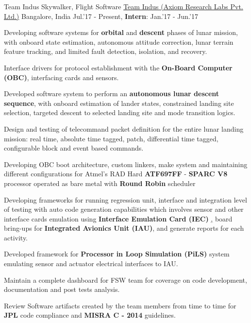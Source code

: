 \begin{cventries}
	\cventry
	{Team Indus Skywalker, Flight Software}
	{\href{http://www.teamindus.in/}{Team Indus (Axiom Research Labs Pvt. Ltd.)}}
	{Bangalore, India}
	{Jul.'17 - Present, \textbf{Intern}: Jan.'17 - Jun.'17}
	{
		\begin{cvitems}
			\item{Developing software systems for \textbf{orbital} and \textbf{descent} phases of lunar mission, with onboard state estimation, autonomous attitude correction, lunar terrain feature tracking, and limited fault detection, isolation, and recovery.}
			\item{Interface drivers for protocol establishment with the \textbf{On-Board Computer (OBC)}\href{http://ww1.microchip.com/downloads/en/DeviceDoc/ATF697FF.pdf}, interfacing cards and sensors.}
			\item{Developed software system to perform an \textbf{autonomous lunar descent sequence}, with onboard estimation of lander states, constrained landing site selection, targeted descent to selected landing site and mode transition logics.}
			\item{Design and testing of telecommand packet definition for the entire lunar landing mission: real time, absolute time tagged, patch, differential time tagged, configurable block and event based commands.}
			\item{Developing OBC boot architecture, custom linkers, make system and maintaining different configurations for Atmel's RAD Hard \textbf{ATF697FF} - \textbf{SPARC V8} processor operated as bare metal with \textbf{Round Robin} scheduler}
			\item{Developing frameworks for running regression unit, interface and integration level of testing with auto code generation capabilities which involves sensor and other interface cards emulation using \textbf{Interface Emulation Card (IEC) }\href{http://zedboard.org/product/microzed/}, board bring-ups for \textbf{Integrated Avionics Unit (IAU)}, and generate reports for each activity.}
			\item{Developed framework for \textbf{Processor in Loop Simulation (PiLS)} system emulating sensor and actuator electrical interfaces to IAU.}
			\item{Maintain a complete dashboard for FSW team for coverage on code development, documentation and post tests analysis.}
\item{Review Software artifacts created by the team members from time to time for \textbf{JPL} code compliance and \textbf{MISRA C - 2014} guidelines.}
		\end{cvitems}
	}
\end{cventries}
